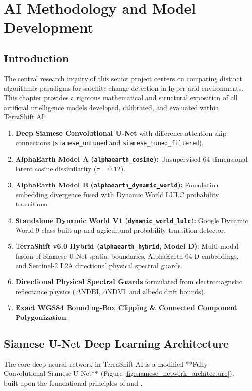 \chapter{AI Methodology and Model Development}
\label{ch:ai_methodology}

\section{Introduction}
\label{sec:ai_intro}
The central research inquiry of this senior project centers on comparing distinct algorithmic paradigms for satellite change detection in hyper-arid environments. This chapter provides a rigorous mathematical and structural exposition of all artificial intelligence models developed, calibrated, and evaluated within TerraShift AI:
\begin{enumerate}
    \item \textbf{Deep Siamese Convolutional U-Net} with difference-attention skip connections (\texttt{siamese\_untuned} and \texttt{siamese\_tuned\_filtered}).
    \item \textbf{AlphaEarth Model A (\texttt{alphaearth\_cosine}):} Unsupervised 64-dimensional latent cosine dissimilarity ($\tau=0.12$).
    \item \textbf{AlphaEarth Model B (\texttt{alphaearth\_dynamic\_world}):} Foundation embedding divergence fused with Dynamic World LULC probability transitions.
    \item \textbf{Standalone Dynamic World V1 (\texttt{dynamic\_world\_lulc}):} Google Dynamic World 9-class built-up and agricultural probability transition detector.
    \item \textbf{TerraShift v6.0 Hybrid (\texttt{alphaearth\_hybrid}, Model D):} Multi-modal fusion of Siamese U-Net spatial boundaries, AlphaEarth 64-D embeddings, and Sentinel-2 L2A directional physical spectral guards.
    \item \textbf{Directional Physical Spectral Guards} formulated from electromagnetic reflectance physics ($\Delta\text{NDBI}, \Delta\text{NDVI}$, and albedo drift bounds).
    \item \textbf{Exact WGS84 Bounding-Box Clipping \& Connected Component Polygonization}.
\end{enumerate}

\section{Siamese U-Net Deep Learning Architecture}
\label{sec:ai_siamese}
The core deep neural network in TerraShift AI is a modified **Fully Convolutional Siamese U-Net** (Figure \ref{fig:siamese_network_architecture}), built upon the foundational principles of \citet{daudt2018fully} and \citet{ronneberger2015unet}.

